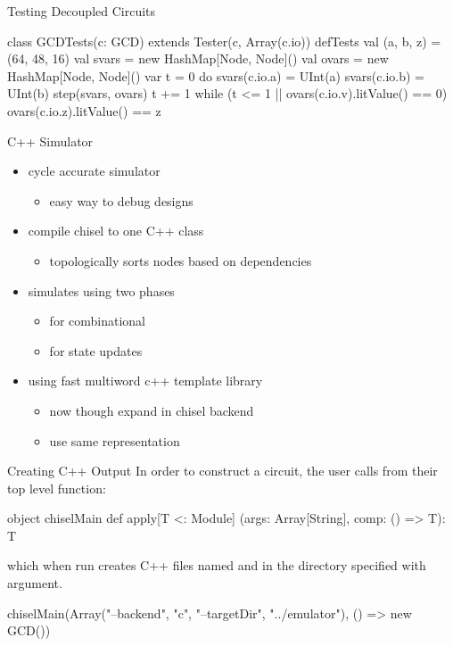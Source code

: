 \documentclass[xcolor=pdflatex,dvipsnames,table]{beamer}
\begin{document}
\begin{frame}[fragile]{Testing Decoupled Circuits}
\begin{scala}
class GCDTests(c: GCD) extends Tester(c, Array(c.io)) {
  defTests {
    val (a, b, z) = (64, 48, 16)
    val svars = new HashMap[Node, Node]()
    val ovars = new HashMap[Node, Node]()
    var t = 0
    do {
      svars(c.io.a) = UInt(a)
      svars(c.io.b) = UInt(b)
      step(svars, ovars)
      t += 1
    } while (t <= 1 || ovars(c.io.v).litValue() == 0)
    ovars(c.io.z).litValue() == z
  }
}
\end{scala}
\end{frame}

\begin{frame}[fragile]{C++ Simulator}
\begin{itemize}
\item cycle accurate simulator
\begin{itemize}
\item easy way to debug designs
\end{itemize}
\item compile chisel to one C++ class
\begin{itemize}
\item topologically sorts nodes based on dependencies
\end{itemize}
\item simulates using two phases
\begin{itemize}
\item {} for combinational
\item {} for state updates
\end{itemize}
\item using fast multiword c++ template library
\begin{itemize}
\item now though expand in chisel backend
\item use same representation 
\end{itemize}
\end{itemize}
\end{frame}

\begin{frame}[fragile]{Creating C++ Output}
In order to construct a circuit, 
the user calls  from their top level  function:

\begin{scala}
object chiselMain {
  def apply[T <: Module]
    (args: Array[String], comp: () => T): T
}
\end{scala}

\noindent
which when run creates C++ files named
 and  in
the directory specified with
 argument.

\begin{scala}
chiselMain(Array("--backend", "c", "--targetDir", "../emulator"), 
           () => new GCD())
\end{scala}

\end{frame}
\end{document}
